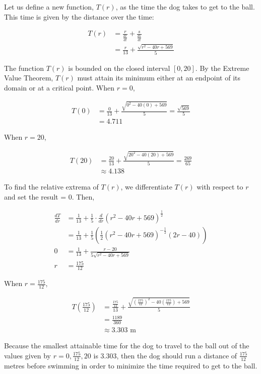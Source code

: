 \documentclass{article}
\begin{document}
    Let us define a new function, $T(r)$, as the time the dog takes to get to the ball. This time is given by the distance over the time:

    \begin{align*}
        T(r)   &= \frac{r}{\frac{dr}{dt}} + \frac{s}{\frac{ds}{dt}} \\
            &= \frac{r}{13} + \frac{\sqrt{r^2-40r+569}}{5}
    \end{align*}

    The function $T(r)$ is bounded on the closed interval $[0,20]$. By the Extreme Value Theorem, $T(r)$ must attain its minimum either at an endpoint of its domain or at a critical point. When $r=0$,

    \begin{align*}
        T(0)    &= \frac{0}{13} + \frac{\sqrt{0^2-40(0)+569}}{5} = \frac{\sqrt{569}}{5} \\
                &= 4.711
    \end{align*}

    When $r=20$,

    \begin{align*}
        T(20)   &= \frac{20}{13}+\frac{\sqrt{20^2-40(20)+569}}{5} = \frac{269}{65} \\
                &\approx 4.138
    \end{align*}

    \pagebreak
    \thispagestyle{6}

    To find the relative extrema of $T(r)$, we differentiate $T(r)$ with respect to $r$ and set the result = 0. Then,

    \begin{align*}
        \frac{dT}{dr}   &= \frac{1}{13} + \frac{1}{5}\cdot\frac{d}{dr}(r^2-40r+569)^{\frac{1}{2}} \\
                        &= \frac{1}{13} + \frac{1}{5}\left(\frac{1}{2}\left(r^2-40r+569\right)^{-\frac{1}{2}}(2r-40)\right) \\
        0               &= \frac{1}{13} + \frac{r-20}{5\sqrt{r^2-40r+569}} \\
        r               &= \frac{175}{12}
    \end{align*}

    When $r=\frac{175}{12}$,

    \begin{align*}
        T\left(\frac{175}{12}\right)   &= \frac{\frac{175}{12}}{13} + \frac{\sqrt{\left(\frac{175}{12}\right)^2-40\left(\frac{175}{12}\right)+569}}{5} \\
                                       &= \frac{1189}{360} \\
                                       &\approx 3.303 \text{ m}
    \end{align*}

    Because the smallest attainable time for the dog to travel to the ball out of the values given by $r=0,\frac{175}{12},20$ is 3.303, then the dog should run a distance of $\frac{175}{12}$ metres before swimming in
    order to minimize the time required to get to the ball.
\end{document}
